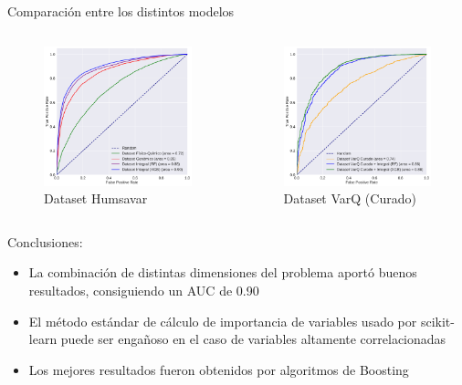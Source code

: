 \documentclass[
  spanish,
  ignorenonframetext,
]{beamer}
\providecommand{\tightlist}{%
  \setlength{\itemsep}{0pt}\setlength{\parskip}{0pt}}
\begin{document}
\begin{frame}{Comparación entre los distintos modelos}
\protect\hypertarget{comparaciuxf3n-entre-los-distintos-modelos}{}

\begin{columns}[T]
\begin{column}{0.48\textwidth}
\begin{figure}
\centering
\includegraphics[width=2.08333in,height=\textheight]{curvas_auc_humsavar.pdf}
\caption{Dataset Humsavar}
\end{figure}
\end{column}

\begin{column}{0.48\textwidth}
\begin{figure}
\centering
\includegraphics[width=2.08333in,height=\textheight]{curvas_auc_varq.pdf}
\caption{Dataset VarQ (Curado)}
\end{figure}
\end{column}
\end{columns}

\end{frame}

\begin{frame}{Conclusiones:}
\protect\hypertarget{conclusiones}{}

\begin{itemize}
\tightlist
\item
  La combinación de distintas dimensiones del problema aportó buenos
  resultados, consiguiendo un AUC de 0.90
\item
  El método estándar de cálculo de importancia de variables usado por
  scikit-learn puede ser engañoso en el caso de variables altamente
  correlacionadas
\item
  Los mejores resultados fueron obtenidos por algoritmos de Boosting
\end{itemize}

\end{frame}
\end{document}
